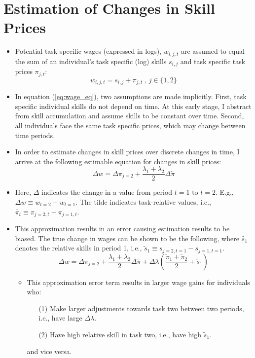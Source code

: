 \documentclass{article}
\begin{document}
\section{Estimation of Changes in Skill Prices}
	\begin{itemize}
		\item{Potential task specific wages (expressed in logs), $w_{i, j, t}$ are assumed to equal the sum of an individual's task specific (log) skills $s_{i,j}$ and task specific task prices $\pi_{j,t}$:}
		\begin{equation} \label{eq:wage_eq}
		w_{i,j,t} = s_{i,j} + \pi_{j,t} \:, \:  j \in \{1, 2\}
		\end{equation}
		\item{In equation (\ref{eq:wage_eq}), two assumptions are made implicitly. First, task specific individual skills do not depend on time. At this early stage, I abstract from skill accumulation and assume skills to be constant over time. Second, all individuals face the same task specific prices, which may change between time periods.}
		\item{In order to estimate changes in skill prices over discrete changes in time, I arrive at the following estimable equation for changes in skill prices:}
		\begin{equation}
		\Delta w = \Delta \pi_{j=2} + \frac{\lambda_1 + \lambda_2}{2} \Delta \tilde{\pi}
		\end{equation}
		\item{Here, $\Delta$ indicates the change in a value from period $t=1$ to $t=2$. E.g., $\Delta w \equiv w_{t=2} - w_{t=1}$. The tilde indicates task-relative values, i.e., $\tilde{\pi_t} \equiv \pi_{j=2, t} - \pi_{j=1, t}$.}
		\item{This approximation results in an error causing estimation results to be biased. The true change in wages can be shown to be the following, where $\tilde{s_1}$ denotes the relative skills in period 1, i.e., $\tilde{s}_1 \equiv s_{j=2, t=1} - s_{j=1, t=1}$.}
		\begin{equation}
		\Delta w = \Delta \pi_{j=2} + \frac{\lambda_1 + \lambda_2}{2} \Delta \tilde{\pi} + \Delta \lambda (\frac{\tilde{\pi}_1 + \tilde{\pi}_2}{2} + \tilde{s}_1)
		\end{equation}

		\begin{itemize}
			\item{This approximation error term results in larger wage gains for individuals who:}
			\begin{itemize}
				\item[(1)]{Make larger adjustments towards task two between two periods, i.e., have large $\Delta \lambda$.}
				\item[(2)]{Have high relative skill in task two, i.e., have high $\tilde{s}_1$.}
			\end{itemize}
			\item[]{and vice versa.}
		\end{itemize}
	\end{itemize}
\end{document}
